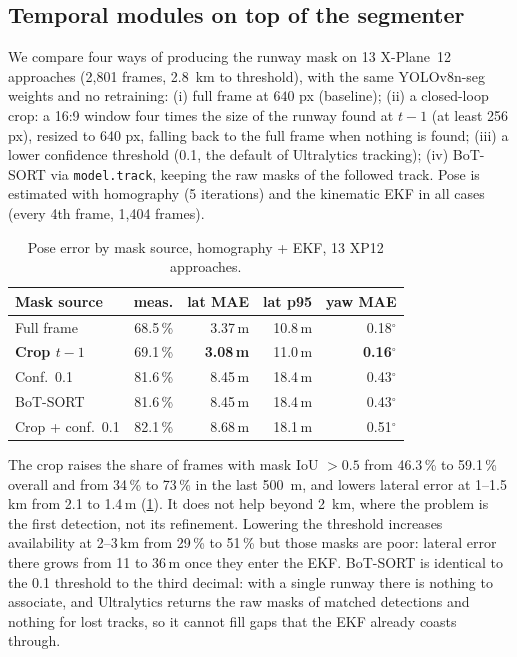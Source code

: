 \subsection{Temporal modules on top of the segmenter}
\label{sec:exp-tracking}
We compare four ways of producing the runway mask on 13 X-Plane~12 approaches (2{,}801 frames, \SI{2.8}{km} to threshold), with the same YOLOv8n-seg weights and no retraining:
(i) full frame at $640$ px (baseline);
(ii) a closed-loop crop: a 16:9 window four times the size of the runway found at $t-1$ (at least 256 px), resized to 640 px, falling back to the full frame when nothing is found;
(iii) a lower confidence threshold (0.1, the default of Ultralytics tracking);
(iv) BoT-SORT via \texttt{model.track}, keeping the raw masks of the followed track.
Pose is estimated with homography (5 iterations) and the kinematic EKF in all cases (every 4th frame, 1{,}404 frames).

\begin{table}[t]
\centering\small
\caption{Pose error by mask source, homography + EKF, 13 XP12 approaches.}
\label{tab:tracking-pose}
\begin{tabular}{lrrrr}
\toprule
Mask source & meas. & lat MAE & lat p95 & yaw MAE \\
\midrule
Full frame & 68.5\,\% & 3.37\,m & 10.8\,m & 0.18$^\circ$ \\
\textbf{Crop $t-1$} & 69.1\,\% & \textbf{3.08\,m} & 11.0\,m & \textbf{0.16$^\circ$} \\
Conf.\ 0.1 & 81.6\,\% & 8.45\,m & 18.4\,m & 0.43$^\circ$ \\
BoT-SORT & 81.6\,\% & 8.45\,m & 18.4\,m & 0.43$^\circ$ \\
Crop + conf.\ 0.1 & 82.1\,\% & 8.68\,m & 18.1\,m & 0.51$^\circ$ \\
\bottomrule
\end{tabular}
\end{table}

The crop raises the share of frames with mask IoU $>0.5$ from 46.3\,\% to 59.1\,\% overall and from 34\,\% to 73\,\% in the last \SI{500}{m}, and lowers lateral error at 1--1.5\,km from 2.1 to 1.4\,m (\cref{tab:tracking-pose}).
It does not help beyond \SI{2}{km}, where the problem is the first detection, not its refinement.
Lowering the threshold increases availability at 2--3\,km from 29\,\% to 51\,\% but those masks are poor: lateral error there grows from 11 to 36\,m once they enter the EKF.
BoT-SORT is identical to the 0.1 threshold to the third decimal: with a single runway there is nothing to associate, and Ultralytics returns the raw masks of matched detections and nothing for lost tracks, so it cannot fill gaps that the EKF already coasts through.
